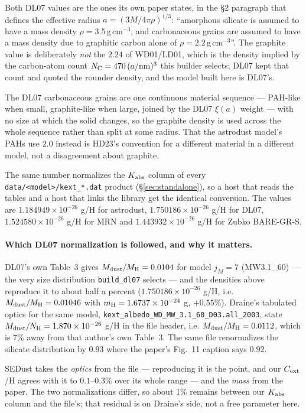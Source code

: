 \documentclass{my_memo}
\newcommand{\code}[1]{\texttt{#1}}
\begin{document}
\noindent Both DL07 values are the ones its own paper states, in the \S2
paragraph that defines the effective radius $a = (3M/4\pi\rho)^{1/3}$:
``amorphous silicate is assumed to have a mass density $\rho = 3.5$\,g\,cm$^{-3}$,
and carbonaceous grains are assumed to have a mass density due to graphitic
carbon alone of $\rho = 2.2$\,g\,cm$^{-3}$''. The graphite value is
deliberately \emph{not} the $2.24$ of WD01/LD01, which is the density implied by
the carbon-atom count $N_{\rm C} = 470\,(a/{\rm nm})^3$ this builder selects;
DL07 kept that count and quoted the rounder density, and the model built here is
DL07's.

The DL07 carbonaceous grains are one continuous material sequence --- PAH-like
when small, graphite-like when large, joined by the DL07 $\xi(a)$ weight ---
with no size at which the solid changes, so the graphite density is used across
the whole sequence rather than split at some radius. That the astrodust model's
PAHs use $2.0$ instead is HD23's convention for a different material in a
different model, not a disagreement about graphite.

The same number normalizes the $K_{\rm abs}$ column of every
\code{data/<model>/kext\_*.dat} product (\S\ref{sec:standalone}), so a host that reads
the tables and a host that links the library get the identical conversion. The
values are $1.184949\times10^{-26}$ g/H for astrodust,
$1.750186\times10^{-26}$ g/H for DL07, $1.524580\times10^{-26}$ g/H for MRN
and $1.443932\times10^{-26}$ g/H for Zubko BARE-GR-S.

\paragraph{Which DL07 normalization is followed, and why it matters.} DL07's
own Table~3 gives $M_{\rm dust}/M_{\rm H} = 0.0104$ for model $j_M = 7$
(MW3.1\_60) --- the very size distribution \code{build\_dl07} selects --- and the
densities above reproduce it to about half a percent
($1.750186\times10^{-26}$ g/H, i.e.\ $M_{\rm dust}/M_{\rm H} = 0.01046$ with
$m_{\rm H} = 1.6737\times10^{-24}$ g, $+0.55$\%). Draine's tabulated optics
for the same model, \code{kext\_albedo\_WD\_MW\_3.1\_60\_D03.all\_2003}, state
$M_{\rm dust}/N_{\rm H} = 1.870\times10^{-26}$ g/H in the file header, i.e.
$M_{\rm dust}/M_{\rm H} = 0.0112$, which is 7\% away from that author's own
Table~3. The same file renormalizes the silicate distribution by $0.93$ where
the paper's Fig.~11 caption says $0.92$.

\noindent SEDust takes the \emph{optics} from the file --- reproducing it is the
point, and our $C_{\rm ext}$/H agrees with it to $0.1$--$0.3$\% over its whole
range --- and the \emph{mass} from the paper. The two normalizations differ, so
about 1\% remains between our $K_{\rm abs}$ column and the file's; that residual
is on Draine's side, not a free parameter here.
\end{document}
